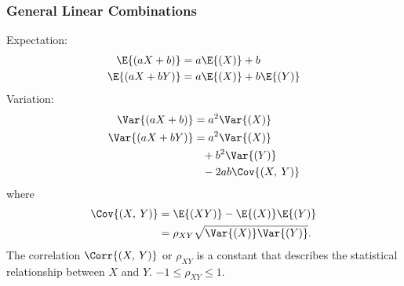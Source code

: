 \documentclass{article}
\begin{document}
\begin{multicols}{3}
    \subsubsection*{General Linear Combinations}
    Expectation:
    \begin{align*}
        \E{\left( aX+b \right)}  & = a\E{\left( X \right)} + b                     \\
        \E{\left( aX+bY \right)} & = a\E{\left( X \right)} + b\E{\left( Y \right)}
    \end{align*}
    Variation:
    \begin{align*}
        \Var{\left( aX+b \right)}  & = a^2\Var{\left( X \right)}                  \\
        \Var{\left( aX+bY \right)} & = a^2\Var{\left( X \right)}                  \\
                                   & \phantom{=} + b^2\Var{\left( Y \right)}      \\
                                   & \phantom{=} - 2ab\Cov{\left( X,\: Y \right)}
    \end{align*}
    where
    \begin{align*}
        \Cov{\left( X,\: Y \right)} & = \E{\left( XY \right)} - \E{\left( X \right)}\E{\left( Y \right)} \\
                                    & = \rho_{XY} \sqrt{\Var{\left( X \right)}\Var{\left( Y \right)}}.
    \end{align*}
    The correlation $\Corr{\left( X,\: Y \right)}$ or $\rho_{XY}$ is a constant that describes the statistical relationship
    between $X$ and $Y$. $-1 \leq \rho_{XY} \leq 1$.
\end{multicols}
\end{document}
